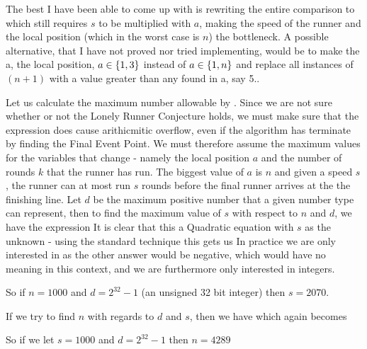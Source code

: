 The best I have been able to come up with is rewriting the entire comparison to 
which still requires $s$ to be multiplied with $a$, making the speed of the runner and the local position (which in the worst case is $n$) the bottleneck. A possible alternative, that I have not proved nor tried implementing, would be to make the a, the local position, $a \in \{1, 3\}$ instead of $a \in \{1, n\}$ and replace all instances of $(n+1)$ with a value greater than any found in a, say 5..

Let us calculate the maximum number allowable by . Since we are not sure whether or not the Lonely Runner Conjecture holds, we must make sure that the expression does cause arithicmitic overflow, even if the algorithm has terminate by finding the Final Event Point. We must therefore assume the maximum values for the variables that change - namely the local position $a$ and the number of rounds $k$ that the runner has run. The biggest value of $a$ is $n$ and given a speed $s$, the runner can at most run $s$ rounds before the final runner arrives at the the finishing line. Let $d$ be the maximum positive number that a given number type can represent, then to find the maximum value of $s$ with respect to $n$ and $d$, we have the expression 
It is clear that this a Quadratic equation with $s$ as the unknown - using the standard technique this gets us
In practice we are only interested in
as the other answer would be negative, which would have no meaning in this context, and we are furthermore only interested in integers.

So if $n = 1000$ and $d = 2^{32}-1$ (an unsigned 32 bit integer) then $s = 2070$.

If we try to find $n$ with regards to $d$ and $s$, then we have
which again becomes

So if we let $s = 1000$ and $d = 2^{32}-1$ then $n = 4289$

